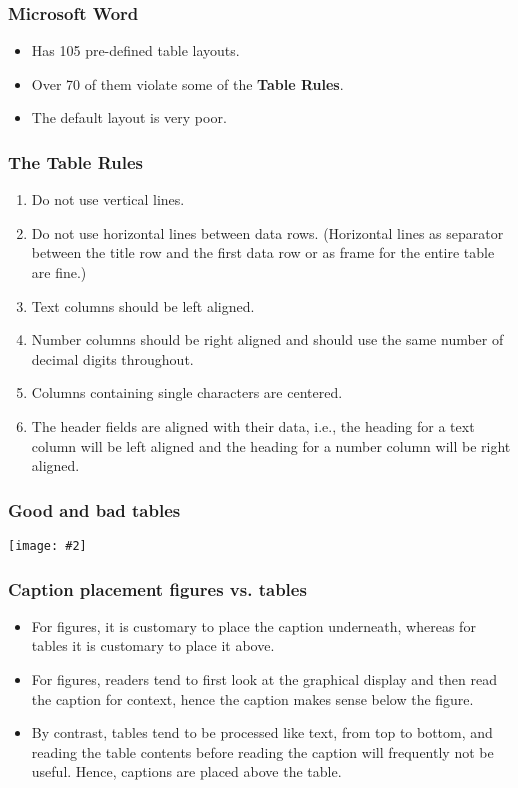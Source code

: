 \documentclass{beamer}
\newcommand{\bi}{\begin{itemize}}
\newcommand{\li}{\item}
\newcommand{\ei}{\end{itemize}}
\newcommand{\fig}[2]{\centerline{\texttt{[image: \#2]}}}
\newcommand{\bfr}[1]{\begin{frame}[fragile]\frametitle{{ #1 }}}
\begin{document}
\bfr{Microsoft Word}
\bi
\li Has 105 pre-defined table layouts.
\li Over 70 of them violate some of the {\bf  Table Rules}.
\li The default layout is very poor.
\ei
\end{frame}

\bfr{The Table Rules}
\begin{enumerate}
\li
Do not use vertical lines.
\li
Do not use horizontal lines between data rows. (Horizontal lines as separator between the title row and the first data row or as frame for the entire table are fine.)
\li
Text columns should be left aligned.
\li
Number columns should be right aligned and should use the same number of decimal digits throughout.
\li
Columns containing single characters are centered.
\li
The header fields are aligned with their data, i.e., the heading for a text column will be left aligned and the heading for a number column will be right aligned.
\end{enumerate}
\end{frame}

\bfr{Good and bad tables}
\fig{1}{table-examples-1.png}
\end{frame}

\bfr{Caption placement figures vs. tables}
\bi
\li  For figures, it is customary to place the caption underneath, whereas for tables it is customary to place it above. 
\li For figures, readers tend to first look at the graphical display and then read the caption for context, hence the caption makes sense below the figure.
\li By contrast, tables tend to be processed like text, from top to bottom, and reading the table contents before reading the caption will frequently not be useful. Hence, captions are placed above the table.
\ei
\end{frame}
\end{document}
